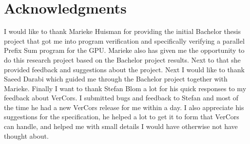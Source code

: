 \documentclass[a4paper]{article}
\begin{document}
\section{Acknowledgments}\label{chapter:acknowledgments}
I would like to thank Marieke Huisman for providing the initial Bachelor thesis project that got me into program verification and specifically verifying a parallel Prefix Sum program for the GPU. Marieke also has given me the opportunity to do this research project based on the Bachelor project results. Next to that she provided feedback and suggestions about the project. Next I would like to thank Saeed Darabi which guided me through the Bachelor project together with Marieke. Finally I want to thank Stefan Blom a lot for his quick responses to my feedback about VerCors. I submitted bugs and feedback to Stefan and most of the time he had a new VerCors release for me within a day. I also appreciate his suggestions for the specification, he helped a lot to get it to form that VerCors can handle, and helped me with small details I would have otherwise not have thought about.




\end{document}
